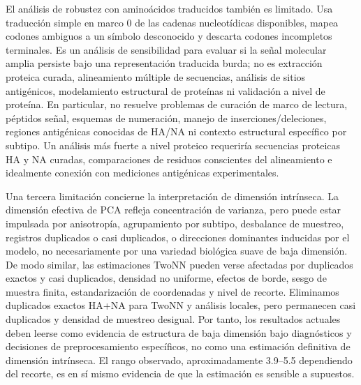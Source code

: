 \documentclass[11pt]{article}
\begin{document}
El análisis de robustez con aminoácidos traducidos también es limitado. Usa traducción simple en marco 0 de las cadenas nucleotídicas disponibles, mapea codones ambiguos a un símbolo desconocido y descarta codones incompletos terminales. Es un análisis de sensibilidad para evaluar si la señal molecular amplia persiste bajo una representación traducida burda; no es extracción proteica curada, alineamiento múltiple de secuencias, análisis de sitios antigénicos, modelamiento estructural de proteínas ni validación a nivel de proteína. En particular, no resuelve problemas de curación de marco de lectura, péptidos señal, esquemas de numeración, manejo de inserciones/deleciones, regiones antigénicas conocidas de HA/NA ni contexto estructural específico por subtipo. Un análisis más fuerte a nivel proteico requeriría secuencias proteicas HA y NA curadas, comparaciones de residuos conscientes del alineamiento e idealmente conexión con mediciones antigénicas experimentales.

Una tercera limitación concierne la interpretación de dimensión intrínseca. La dimensión efectiva de PCA refleja concentración de varianza, pero puede estar impulsada por anisotropía, agrupamiento por subtipo, desbalance de muestreo, registros duplicados o casi duplicados, o direcciones dominantes inducidas por el modelo, no necesariamente por una variedad biológica suave de baja dimensión. De modo similar, las estimaciones TwoNN pueden verse afectadas por duplicados exactos y casi duplicados, densidad no uniforme, efectos de borde, sesgo de muestra finita, estandarización de coordenadas y nivel de recorte. Eliminamos duplicados exactos HA+NA para TwoNN y análisis locales, pero permanecen casi duplicados y densidad de muestreo desigual. Por tanto, los resultados actuales deben leerse como evidencia de estructura de baja dimensión bajo diagnósticos y decisiones de preprocesamiento específicos, no como una estimación definitiva de dimensión intrínseca. El rango observado, aproximadamente 3.9--5.5 dependiendo del recorte, es en sí mismo evidencia de que la estimación es sensible a supuestos.
\end{document}
